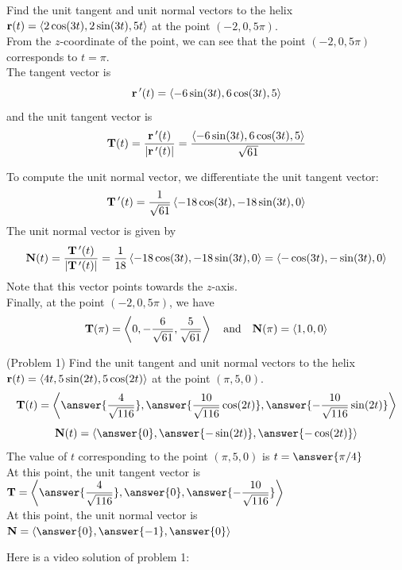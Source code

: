 \documentclass[handout]{ximera}
\begin{document}
\begin{example}[example 1]
Find the unit tangent and unit normal vectors to the helix $\mathbf r(t) =  \left\langle 2\cos(3t), 2\sin(3t), 5t\right\rangle$ at the point $(-2, 0, 5\pi)$.\\
From the $z$-coordinate of the point, we can see that the point $(-2, 0, 5\pi)$ corresponds to $t = \pi$.\\
The tangent vector is
\[
\mathbf r \,'(t) = \left\langle -6 \sin(3t), 6\cos(3t), 5\right\rangle
\]
and the unit tangent vector is
\[
\mathbf T(t) = \frac{\mathbf r\,'(t)}{|\mathbf r\,'(t)|} = \frac{\left\langle -6 \sin(3t), 6\cos(3t), 5\right\rangle}{\sqrt{61}}
\]

To compute the unit normal vector, we differentiate the unit tangent vector:
\[
\mathbf T\,'(t) = \frac{1}{\sqrt{61}} \left\langle -18 \cos(3t), -18 \sin(3t), 0\right\rangle
\]
The unit normal vector is given by
\[
\mathbf N(t) = \frac{\mathbf T\,'(t)}{|\mathbf T\,'(t)|} = \frac{1}{18} \left\langle -18 \cos(3t), -18 \sin(3t), 0\right\rangle = \left\langle -\cos(3t), -\sin(3t), 0\right\rangle
\]
Note that this vector points towards the $z$-axis.\\
Finally, at the point $(-2, 0, 5\pi)$, we have
\[
\mathbf T(\pi) = \left\langle 0, -\frac{6}{\sqrt{61}}, \frac{5}{\sqrt{61}}\right\rangle \quad \text{and} \quad \mathbf N(\pi) = \left\langle 1, 0, 0\right\rangle
\]
\end{example}


\begin{problem}(Problem 1)
Find the unit tangent and unit normal vectors to the helix $\mathbf r(t) = \left\langle 4t, 5 \sin(2t),5\cos(2t)\right\rangle$ at the point $(\pi, 5, 0)$.\\
\[
\vec T(t) = \vector{\answer{\frac{4}{\sqrt{116}}}, \answer{\frac{10}{\sqrt{116}}\cos(2t)}, \answer{-\frac{10}{\sqrt{116}}\sin(2t)}}
\]
\[
\vec N(t) = \vector{\answer{0}, \answer{-\sin(2t)}, \answer{-\cos(2t)}}
\]
The value of $t$ corresponding to the point $(\pi, 5, 0)$ is $t = \answer{\pi /4}$\\

At this point, the unit tangent vector is $\displaystyle \vec T = \vector{\answer{\frac{4}{\sqrt{116}}}, \answer{0}, \answer{-\frac{10}{\sqrt{116}}}}$\\
At this point, the unit normal vector is $\displaystyle \vec N = \vector{\answer{0}, \answer{-1}, \answer{0}}$\\

\end{problem}

Here is a video solution of problem 1:\\
\begin{foldable}
\end{foldable}
\end{document}
